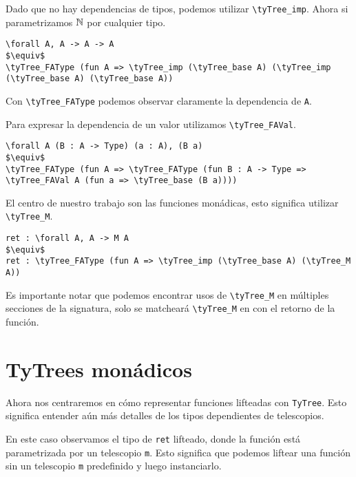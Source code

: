 Dado que no hay dependencias de tipos, podemos utilizar \lstinline{\tyTree_imp}. Ahora si parametrizamos
$\mathbb{N}$ por cualquier tipo.

\begin{lstlisting}
\forall A, A -> A -> A
$\equiv$
\tyTree_FAType (fun A => \tyTree_imp (\tyTree_base A) (\tyTree_imp (\tyTree_base A) (\tyTree_base A))
\end{lstlisting}

Con \lstinline{\tyTree_FAType} podemos observar claramente la dependencia de \lstinline{A}.

Para expresar la dependencia de un valor utilizamos \lstinline{\tyTree_FAVal}.

\begin{lstlisting}
\forall A (B : A -> Type) (a : A), (B a)
$\equiv$
\tyTree_FAType (fun A => \tyTree_FAType (fun B : A -> Type => \tyTree_FAVal A (fun a => \tyTree_base (B a))))
\end{lstlisting}

El centro de nuestro trabajo son las funciones monádicas, esto significa utilizar \lstinline{\tyTree_M}.

\begin{lstlisting}
ret : \forall A, A -> M A
$\equiv$
ret : \tyTree_FAType (fun A => \tyTree_imp (\tyTree_base A) (\tyTree_M A))
\end{lstlisting}

Es importante notar que podemos encontrar usos de \lstinline{\tyTree_M} en múltiples secciones de la signatura, solo se matcheará \lstinline{\tyTree_M} en \lift con el retorno de la función. 
\fi


\section{TyTrees monádicos}

Ahora nos centraremos en cómo representar funciones lifteadas con \lstinline{TyTree}.
Esto significa entender aún más detalles de los tipos dependientes de telescopios.

En este caso observamos el tipo de \lstinline{ret} lifteado, donde la función está parametrizada por un telescopio \lstinline{m}.
Esto significa que podemos liftear una función sin un telescopio \lstinline{m} predefinido y luego instanciarlo.

